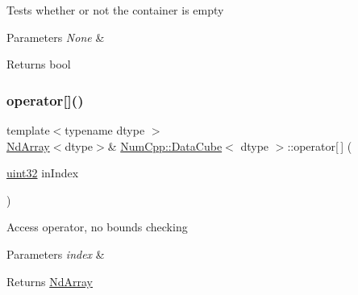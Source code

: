 Tests whether or not the container is empty


\begin{DoxyParams}{Parameters}
{\em None} & \\
\hline
\end{DoxyParams}
\begin{DoxyReturn}{Returns}
bool 
\end{DoxyReturn}
\mbox{\label{class_num_cpp_1_1_data_cube_ad99626cc18561e39f0ec9f8c49c56de5}} 
\subsubsection{\texorpdfstring{operator[]()}{operator[]()}\hspace{0.1cm}{\footnotesize\ttfamily [1/2]}}
{\footnotesize\ttfamily template$<$typename dtype $>$ \\
\mbox{\hyperlink{class_num_cpp_1_1_nd_array}{Nd\+Array}}$<$dtype$>$\& \mbox{\hyperlink{class_num_cpp_1_1_data_cube}{Num\+Cpp\+::\+Data\+Cube}}$<$ dtype $>$\+::operator\mbox{[}$\,$\mbox{]} (\begin{DoxyParamCaption}\item[{\mbox{\hyperlink{namespace_num_cpp_a36f388e948380413c63011cab9b7fbd5}{uint32}}}]{in\+Index }\end{DoxyParamCaption})\hspace{0.3cm}{\ttfamily [inline]}}

Access operator, no bounds checking


\begin{DoxyParams}{Parameters}
{\em index} & \\
\hline
\end{DoxyParams}
\begin{DoxyReturn}{Returns}
\mbox{\hyperlink{class_num_cpp_1_1_nd_array}{Nd\+Array}} 
\end{DoxyReturn}
\mbox{\label{class_num_cpp_1_1_data_cube_a891411d7c787f5fb927f1d8269b84ec8}} 
